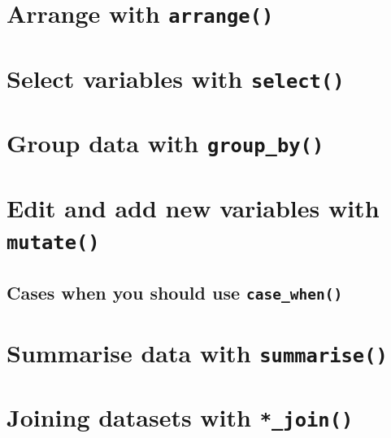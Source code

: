 \documentclass[]{book}
\begin{document}
\hypertarget{arrange-with-arrange}{%
\section{\texorpdfstring{Arrange with \texttt{arrange()}}{Arrange with arrange()}}\label{arrange-with-arrange}}

\hypertarget{select-variables-with-select}{%
\section{\texorpdfstring{Select variables with \texttt{select()}}{Select variables with select()}}\label{select-variables-with-select}}

\hypertarget{group-data-with-group_by}{%
\section{\texorpdfstring{Group data with \texttt{group\_by()}}{Group data with group\_by()}}\label{group-data-with-group_by}}

\hypertarget{edit-and-add-new-variables-with-mutate}{%
\section{\texorpdfstring{Edit and add new variables with \texttt{mutate()}}{Edit and add new variables with mutate()}}\label{edit-and-add-new-variables-with-mutate}}

\hypertarget{cases-when-you-should-use-case_when}{%
\subsection{\texorpdfstring{Cases when you should use \texttt{case\_when()}}{Cases when you should use case\_when()}}\label{cases-when-you-should-use-case_when}}

\hypertarget{summarise-data-with-summarise}{%
\section{\texorpdfstring{Summarise data with \texttt{summarise()}}{Summarise data with summarise()}}\label{summarise-data-with-summarise}}

\hypertarget{joining-datasets-with-_join}{%
\section{\texorpdfstring{Joining datasets with \texttt{*\_join()}}{Joining datasets with *\_join()}}\label{joining-datasets-with-_join}}
\end{document}
